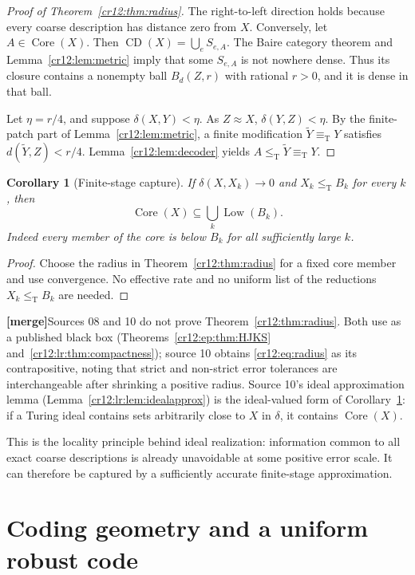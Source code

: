 \documentclass[11pt,letterpaper]{article}
\theoremstyle{plain}
\newtheorem{corollary}[theorem]{Corollary}
\theoremstyle{definition}
\theoremstyle{remark}
\numberwithin{equation}{section}
\newcommand{\leT}{\leq_{\mathrm T}}
\newcommand{\eqT}{\equiv_{\mathrm T}}
\newcommand{\Core}{\operatorname{Core}}
\newcommand{\CD}{\operatorname{CD}}
\newcommand{\Low}{\operatorname{Low}}
\newcommand{\mergenote}[1]{\par\smallskip\noindent
 {\small\textsf{\textbf{[merge]}}\enspace #1}\par\smallskip}
\begin{document}
\begin{proof}[Proof of Theorem~\ref{cr12:thm:radius}]
The right-to-left direction holds because every coarse description has distance
zero from $X$. Conversely, let $A\in\Core(X)$. Then
$\CD(X)=\bigcup_e S_{e,A}$. The Baire category theorem and
Lemma~\ref{cr12:lem:metric} imply that some $S_{e,A}$ is not nowhere dense.
Thus its closure contains a nonempty ball $B_d(Z,r)$ with rational $r>0$,
and it is dense in that ball.

Let $\eta=r/4$, and suppose $\delta(X,Y)<\eta$. As $Z\approx X$,
$\delta(Y,Z)<\eta$. By the finite-patch part of Lemma~\ref{cr12:lem:metric}, a finite
modification $\widetilde Y\eqT Y$ satisfies $d(\widetilde Y,Z)<r/4$.
Lemma~\ref{cr12:lem:decoder} yields $A\leT\widetilde Y\eqT Y$.
\end{proof}

\begin{corollary}[Finite-stage capture]\label{cr12:cor:capture}
If $\delta(X,X_k)\to0$ and $X_k\leT B_k$ for every $k$, then
\[
 \Core(X)\subseteq\bigcup_k\Low(B_k).
\]
Indeed every member of the core is below $B_k$ for all sufficiently large $k$.
\end{corollary}
\begin{proof}
Choose the radius in Theorem~\ref{cr12:thm:radius} for a fixed core member and use
convergence. No effective rate and no uniform list of the reductions
$X_k\leT B_k$ are needed.
\end{proof}
\mergenote{Sources 08 and 10 do not prove Theorem~\ref{cr12:thm:radius}. Both use
\cite[Theorem~3.7]{HJKS} as a published black box
(Theorems~\ref{cr12:ep:thm:HJKS} and~\ref{cr12:lr:thm:compactness}); source 10 obtains
\eqref{cr12:eq:radius} as its contrapositive, noting that strict and non-strict error
tolerances are interchangeable after shrinking a positive radius. Source 10's
ideal approximation lemma (Lemma~\ref{cr12:lr:lem:idealapprox}) is the ideal-valued
form of Corollary~\ref{cr12:cor:capture}: if a Turing ideal contains sets
arbitrarily close to $X$ in $\delta$, it contains $\Core(X)$.}

This is the locality principle behind ideal realization: information common to
all exact coarse descriptions is already unavoidable at some positive error
scale. It can therefore be captured by a sufficiently accurate finite-stage
approximation.

\section{Coding geometry and a uniform robust code}\label{cr12:sec:codes}
\end{document}
